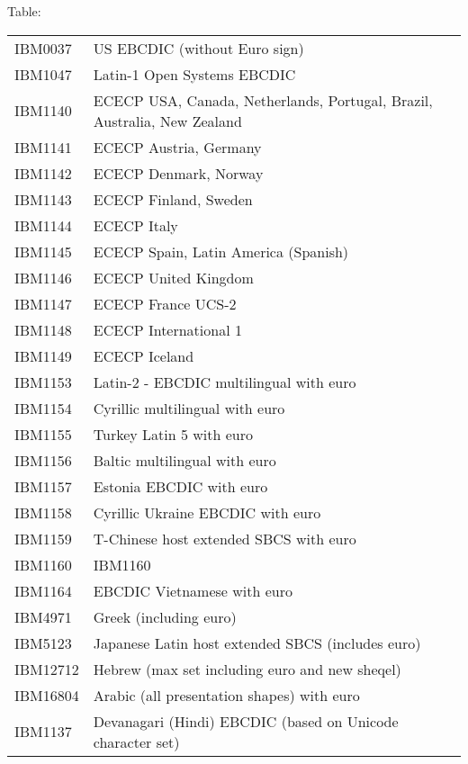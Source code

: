 \documentclass[letterpaper,10pt,english]{sphinxmanual}
\begin{document}
Table:


\begin{savenotes}\sphinxattablestart
\centering
\begin{tabulary}{\linewidth}[t]{|T|T|}
\hline
{}\relax &\relax \\
\hline
IBM0037
&
US EBCDIC (without Euro sign)
\\
\hline
IBM1047
&
Latin-1 Open Systems EBCDIC
\\
\hline
IBM1140
&
ECECP USA, Canada, Netherlands, Portugal, Brazil, Australia, New Zealand
\\
\hline
IBM1141
&
ECECP Austria, Germany
\\
\hline
IBM1142
&
ECECP Denmark, Norway
\\
\hline
IBM1143
&
ECECP Finland, Sweden
\\
\hline
IBM1144
&
ECECP Italy
\\
\hline
IBM1145
&
ECECP Spain, Latin America (Spanish)
\\
\hline
IBM1146
&
ECECP United Kingdom
\\
\hline
IBM1147
&
ECECP France UCS-2
\\
\hline
IBM1148
&
ECECP International 1
\\
\hline
IBM1149
&
ECECP Iceland
\\
\hline
IBM1153
&
Latin-2 - EBCDIC multilingual with euro
\\
\hline
IBM1154
&
Cyrillic multilingual with euro
\\
\hline
IBM1155
&
Turkey Latin 5 with euro
\\
\hline
IBM1156
&
Baltic multilingual with euro
\\
\hline
IBM1157
&
Estonia EBCDIC with euro
\\
\hline
IBM1158
&
Cyrillic Ukraine EBCDIC with euro
\\
\hline
IBM1159
&
T-Chinese host extended SBCS with euro
\\
\hline
IBM1160
&
IBM1160
\\
\hline
IBM1164
&
EBCDIC Vietnamese with euro
\\
\hline
IBM4971
&
Greek (including euro)
\\
\hline
IBM5123
&
Japanese Latin host extended SBCS (includes euro)
\\
\hline
IBM12712
&
Hebrew (max set including euro and new sheqel)
\\
\hline
IBM16804
&
Arabic (all presentation shapes) with euro
\\
\hline
IBM1137
&
Devanagari (Hindi) EBCDIC (based on Unicode character set)
\\
\hline
\end{tabulary}
\par
\sphinxattableend\end{savenotes}
\end{document}
